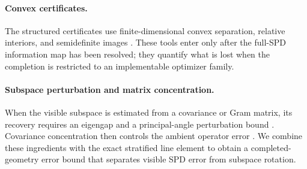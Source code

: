 \paragraph{Convex certificates.}
The structured certificates use finite-dimensional convex separation,
relative interiors, and semidefinite images
\citep{rockafellar1970convex,vandenberghe1996semidefinite,boyd2004convex}.
These tools enter only after the full-SPD information map has been resolved;
they quantify what is lost when the completion is restricted to an
implementable optimizer family.

\paragraph{Subspace perturbation and matrix concentration.}
When the visible subspace is estimated from a covariance or Gram matrix, its
recovery requires an eigengap and a principal-angle perturbation bound
\citep{yu2015davis}.  Covariance concentration then controls the ambient
operator error \citep{tropp2015matrix}.  We combine these ingredients with
the exact stratified line element to obtain a completed-geometry error bound
that separates visible SPD error from subspace rotation.
